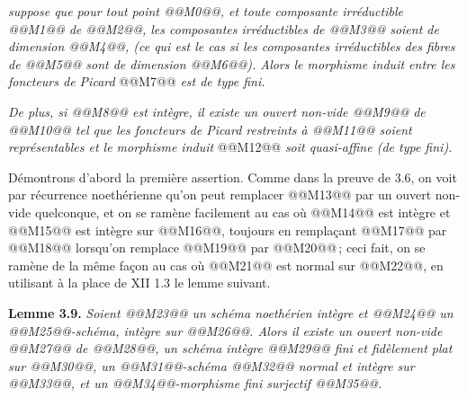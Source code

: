 
\emph{suppose que pour tout point @@M0@@, et toute composante irr\'eductible @@M1@@ de @@M2@@, les composantes irr\'eductibles de @@M3@@ soient de dimension @@M4@@, (ce qui est le cas si les composantes irr\'eductibles des fibres de @@M5@@ sont de dimension @@M6@@). Alors le morphisme induit entre les foncteurs de Picard}
@@M7@@
\emph{est de type fini.}

\emph{De plus, si @@M8@@ est int\`egre, il existe un ouvert non-vide @@M9@@ de @@M10@@ tel que les foncteurs de Picard restreints \`a @@M11@@ soient repr\'esentables et le morphisme induit}
@@M12@@
\emph{soit quasi-affine (de type fini).}

D\'emontrons d'abord la premi\`ere assertion. Comme dans la preuve de 3.6, on voit par r\'ecurrence noeth\'erienne qu'on peut remplacer @@M13@@ par un ouvert non-vide quelconque, et on se ram\`ene facilement au cas o\`u @@M14@@ est int\`egre et @@M15@@ est int\`egre sur @@M16@@, toujours en rempla\c{c}ant @@M17@@ par @@M18@@ lorsqu'on remplace @@M19@@ par @@M20@@\,; ceci fait, on se ram\`ene de la m\^eme fa\c{c}on au cas o\`u @@M21@@ est normal sur @@M22@@, en utilisant \`a la place de XII 1.3 le lemme suivant.

\textbf{Lemme 3.9.} \emph{Soient @@M23@@ un sch\'ema noeth\'erien int\`egre et @@M24@@ un @@M25@@-sch\'ema, int\`egre sur @@M26@@. Alors il existe un ouvert non-vide @@M27@@ de @@M28@@, un sch\'ema int\`egre @@M29@@ fini et fid\`element plat sur @@M30@@, un @@M31@@-sch\'ema @@M32@@ normal et int\`egre sur @@M33@@, et un @@M34@@-morphisme fini surjectif @@M35@@.}

